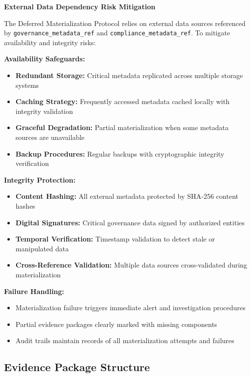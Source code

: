 \documentclass[12pt,a4paper]{article}
\begin{document}
\begin{infobox}
\textbf{External Data Dependency Risk Mitigation}

The Deferred Materialization Protocol relies on external data sources referenced by \texttt{governance\_metadata\_ref} and \texttt{compliance\_metadata\_ref}. To mitigate availability and integrity risks:

\textbf{Availability Safeguards:}
\begin{itemize}
\item \textbf{Redundant Storage:} Critical metadata replicated across multiple storage systems
\item \textbf{Caching Strategy:} Frequently accessed metadata cached locally with integrity validation
\item \textbf{Graceful Degradation:} Partial materialization when some metadata sources are unavailable
\item \textbf{Backup Procedures:} Regular backups with cryptographic integrity verification
\end{itemize}

\textbf{Integrity Protection:}
\begin{itemize}
\item \textbf{Content Hashing:} All external metadata protected by SHA-256 content hashes
\item \textbf{Digital Signatures:} Critical governance data signed by authorized entities
\item \textbf{Temporal Verification:} Timestamp validation to detect stale or manipulated data
\item \textbf{Cross-Reference Validation:} Multiple data sources cross-validated during materialization
\end{itemize}

\textbf{Failure Handling:}
\begin{itemize}
\item Materialization failure triggers immediate alert and investigation procedures
\item Partial evidence packages clearly marked with missing components
\item Audit trails maintain records of all materialization attempts and failures
\end{itemize}
\end{infobox}

\subsection{Evidence Package Structure}
\end{document}
